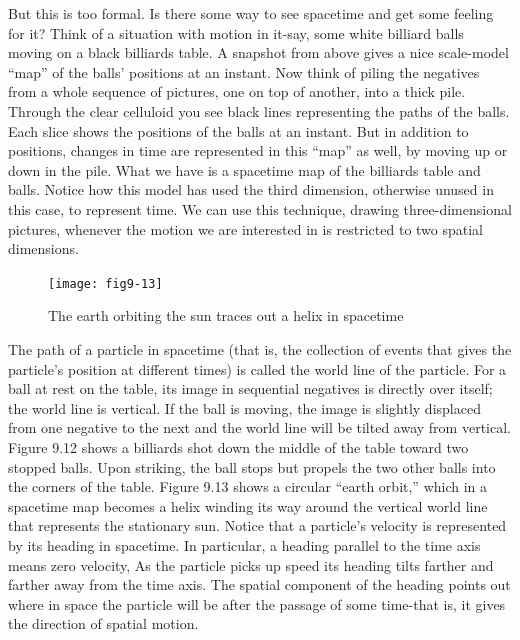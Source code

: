 \documentclass{book}
\begin{document}
But this is too formal. Is there some way to see spacetime and get
some feeling for it? Think of a situation with motion in it-say, some
white billiard balls moving on a black billiards table. A snapshot from
above gives a nice scale-model ``map'' of the balls' positions at an instant.
Now think of piling the negatives from a whole sequence of pictures,
one on top of another, into a thick pile. Through the clear celluloid you
see black lines representing the paths of the balls. Each slice shows the
positions of the balls at an instant. But in addition to positions, changes
in time are represented in this ``map'' as well, by moving up or down in
the pile. What we have is a spacetime map of the billiards table and balls.
Notice how this model has used the third dimension, otherwise unused
in this case, to represent time. We can use this technique, drawing
three-dimensional pictures, whenever the motion we are interested in is
restricted to two spatial dimensions.

\begin{figure}
\begin{center}
\texttt{[image: fig9-13]}
\caption{The earth orbiting the sun traces out a helix in spacetime}
\end{center}
\end{figure}

The path of a particle in spacetime (that is, the collection of events
that gives the particle's position at different times) is called the world
line of the particle. For a ball at rest on the table, its image in sequential
negatives is directly over itself; the world line is vertical. If the ball is
moving, the image is slightly displaced from one negative to the next
and the world line will be tilted away from vertical. Figure 9.12 shows
a billiards shot down the middle of the table toward two stopped balls.
Upon striking, the ball stops but propels the two other balls into the
corners of the table. Figure 9.13 shows a circular ``earth orbit,'' which
in a spacetime map becomes a helix winding its way around the vertical
world line that represents the stationary sun. Notice that a particle's
velocity is represented by its heading in spacetime. In particular, a
heading parallel to the time axis means zero velocity, As the particle
picks up speed its heading tilts farther and farther away from the time
axis. The spatial component of the heading points out where in space
the particle will be after the passage of some time-that is, it gives the
direction of spatial motion.
\end{document}
